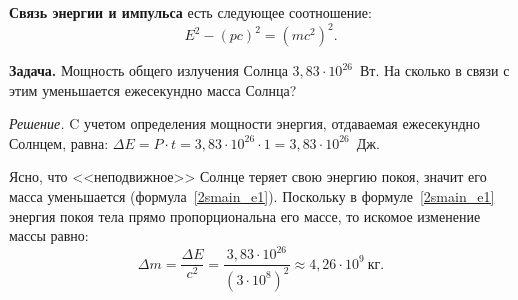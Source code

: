 \documentclass[main.tex]{subfiles}
\begin{document}
\textbf{Связь энергии и импульса} есть следующее соотношение:
\begin{equation}
    E^2-\left(pc\right)^2=\left(mc^2\right)^2.
\end{equation}

\medskip

\noindent\textbf{Задача.} Мощность общего излучения Солнца $3{,}83\cdot10^{26}$~Вт. На сколько в связи с этим уменьшается ежесекундно масса Солнца?

\smallskip

\noindent\emph{Решение.} C учетом определения мощности энергия, отдаваемая ежесекундно Солнцем, равна: $\Delta E=P\cdot t=3{,}83\cdot10^{26}\cdot1=3{,}83\cdot10^{26}$~Дж.

Ясно, что <<неподвижное>> Солнце теряет свою энергию покоя, значит его масса уменьшается (формула~\eqref{2smain_e1}). Поскольку в формуле~\eqref{2smain_e1} энергия покоя тела прямо пропорциональна его массе, то искомое изменение массы равно:
\begin{equation*}
    \Delta m=\frac{\Delta E}{c^2}=\frac{3{,}83\cdot10^{26}}{(3\cdot10^8)^2}\approx4{,}26\cdot10^9~\text{кг}.
\end{equation*}
\end{document}
